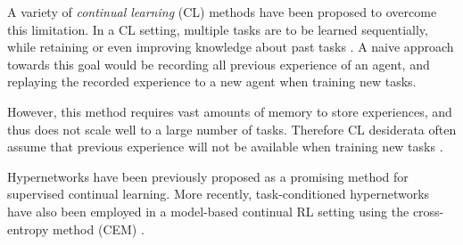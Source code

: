 \documentclass[dvipsnames]{article} %
\newcommand{\commentOLD}[1]{}
\newcommand{\saOLD}[1] {\commentOLD{{\color{cyan} SA: #1}}}                %
\newcommand{\jhOLD}[1] {\commentOLD{{\color{RawSienna} JH: #1}}}           %
\begin{document}
A variety of \textit{continual learning} (CL) methods have been proposed to overcome this limitation. In a CL setting, multiple tasks are to be learned sequentially, while retaining or even improving knowledge about past tasks \citep{towardsCRL}. A naive approach towards this goal would be recording all previous experience of an agent, and replaying the recorded experience to a new agent when training new tasks. 
\saOLD{For RL there is no training data as in supervised learning. What can be stored are the (S,A,R,S') tuples in a replay buffer which can then be utilized by an offline RL algorithm. Is this what you wanted to imply?}
However, this method requires vast amounts of memory to store experiences, and thus does not scale well to a large number of tasks. Therefore CL desiderata often assume that previous experience will not be available when training new tasks \citep{lwf}. 

\saOLD{This (or the end of this paragraph) is a good place to mention that previous work has used HN for model based RL, and we show that HN is a good candidate for continual RL for a state-of-the-art model-free algorithm as well. You should also mention the other differences with the MBRL paper (e.g. more types of doors, reporting of the door opening rate, etc.}
Hypernetworks have been previously proposed as a promising method \citep{CLHypernetworks} for supervised continual learning. More recently, task-conditioned hypernetworks have also been employed in a model-based continual RL setting using the cross-entropy method (CEM) \citep{MBRLHypernetworks}. 


\end{document}
